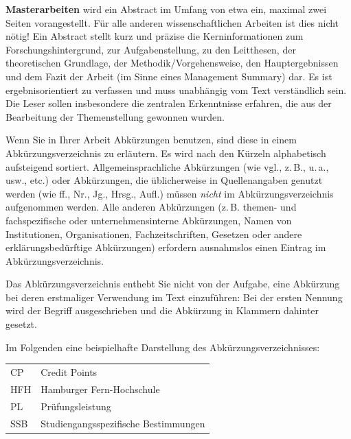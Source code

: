 
\MakeThesisTitle

\ifIncludeAbstract %
  \textbf{Masterarbeiten} wird ein Abstract im Umfang von etwa ein, maximal zwei
  Seiten vorangestellt. Für alle anderen wissenschaftlichen Arbeiten ist dies
  nicht nötig! Ein Abstract stellt kurz und präzise die Kerninformationen zum
  Forschungshintergrund, zur Aufgabenstellung, zu den Leitthesen, der
  theoretischen Grundlage, der Methodik/Vorgehensweise, den Hauptergebnissen
  und dem Fazit der Arbeit (im Sinne eines Management Summary) dar. Es ist
  ergebnisorientiert zu verfassen und muss unabhängig vom Text verständlich
  sein. Die Leser sollen insbesondere die zentralen Erkenntnisse erfahren,
  die aus der Bearbeitung der Themenstellung gewonnen wurden.
\fi

\ThesisTableOfContents %
\listoffigures %
\listoftables %

Wenn Sie in Ihrer Arbeit Abkürzungen benutzen, sind diese in einem
Abkürzungsverzeichnis zu erläutern. Es wird nach den Kürzeln alphabetisch
aufsteigend sortiert. Allgemeinsprachliche Abkürzungen (wie vgl., z.\,B.,
u.\,a., usw., etc.) oder Abkürzungen, die üblicherweise in Quellenangaben
genutzt werden (wie ff., Nr., Jg., Hrsg., Aufl.) müssen \textit{nicht} im
Abkürzungsverzeichnis aufgenommen werden. Alle anderen Abkürzungen (z.\,B.
themen- und fachspezifische oder unternehmensinterne Abkürzungen, Namen von
Institutionen, Organisationen, Fachzeitschriften, Gesetzen oder andere
erklärungsbedürftige Abkürzungen) erfordern ausnahmslos einen Eintrag im
Abkürzungsverzeichnis.

Das Abkürzungsverzeichnis enthebt Sie nicht von der Aufgabe, eine Abkürzung
bei deren erstmaliger Verwendung im Text einzuführen: Bei der ersten Nennung
wird der Begriff ausgeschrieben und die Abkürzung in Klammern dahinter
gesetzt.

Im Folgenden eine beispielhafte Darstellung des
Abkürzungsverzeichnisses:

\begin{tabularx}{\textwidth}{@{}p{2.5cm}Y@{}}
  CP  & Credit Points \\
  HFH & Hamburger Fern-Hochschule \\
  PL  & Prüfungsleistung \\
  SSB & Studiengangsspezifische Bestimmungen
\end{tabularx}
